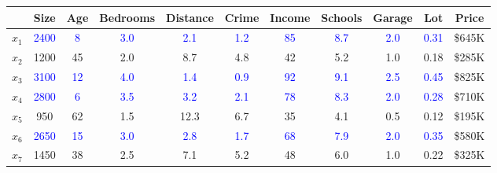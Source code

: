   \begin{example}
    \label{ex:regression-on-continuous-covariates}
    \begin{table}[H]
      \centering
      {\footnotesize 
      \begin{tabular}{|c|c|c|c|c|c|c|c|c|c|c|}
        \hline
        & Size & Age & Bedrooms & Distance & Crime & Income & Schools & Garage & Lot & Price \\
        \hline
        $x_1$ & \textcolor{blue}{2400} & \textcolor{blue}{8} & \textcolor{blue}{3.0} & \textcolor{blue}{2.1} & \textcolor{blue}{1.2} & \textcolor{blue}{85} & \textcolor{blue}{8.7} & \textcolor{blue}{2.0} & \textcolor{blue}{0.31} & \$645K \\
        \hline
        $x_2$ & \textcolor{green!50!black}{1200} & \textcolor{green!50!black}{45} & \textcolor{green!50!black}{2.0} & \textcolor{green!50!black}{8.7} & \textcolor{green!50!black}{4.8} & \textcolor{green!50!black}{42} & \textcolor{green!50!black}{5.2} & \textcolor{green!50!black}{1.0} & \textcolor{green!50!black}{0.18} & \$285K \\
        \hline
        $x_3$ & \textcolor{blue}{3100} & \textcolor{blue}{12} & \textcolor{blue}{4.0} & \textcolor{blue}{1.4} & \textcolor{blue}{0.9} & \textcolor{blue}{92} & \textcolor{blue}{9.1} & \textcolor{blue}{2.5} & \textcolor{blue}{0.45} & \$825K \\
        \hline
        $x_4$ & \textcolor{blue}{2800} & \textcolor{blue}{6} & \textcolor{blue}{3.5} & \textcolor{blue}{3.2} & \textcolor{blue}{2.1} & \textcolor{blue}{78} & \textcolor{blue}{8.3} & \textcolor{blue}{2.0} & \textcolor{blue}{0.28} & \$710K \\
        \hline
        $x_5$ & \textcolor{green!50!black}{950} & \textcolor{green!50!black}{62} & \textcolor{green!50!black}{1.5} & \textcolor{green!50!black}{12.3} & \textcolor{green!50!black}{6.7} & \textcolor{green!50!black}{35} & \textcolor{green!50!black}{4.1} & \textcolor{green!50!black}{0.5} & \textcolor{green!50!black}{0.12} & \$195K \\
        \hline
        $x_6$ & \textcolor{blue}{2650} & \textcolor{blue}{15} & \textcolor{blue}{3.0} & \textcolor{blue}{2.8} & \textcolor{blue}{1.7} & \textcolor{blue}{68} & \textcolor{blue}{7.9} & \textcolor{blue}{2.0} & \textcolor{blue}{0.35} & \$580K \\
        \hline
        $x_7$ & \textcolor{green!50!black}{1450} & \textcolor{green!50!black}{38} & \textcolor{green!50!black}{2.5} & \textcolor{green!50!black}{7.1} & \textcolor{green!50!black}{5.2} & \textcolor{green!50!black}{48} & \textcolor{green!50!black}{6.0} & \textcolor{green!50!black}{1.0} & \textcolor{green!50!black}{0.22} & \$325K \\

\end{tabular}}
\end{table}
\end{example}
